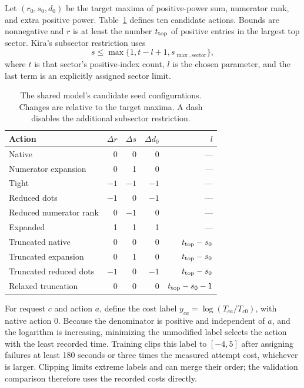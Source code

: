 Let $(r_0,s_0,d_0)$ be the target maxima of positive-power sum, numerator rank, and extra positive power. Table~\ref{project:tab:shared-actions} defines ten candidate actions. Bounds are nonnegative and $r$ is at least the number $t_{\rm top}$ of positive entries in the largest top sector. Kira's subsector restriction uses~\cite{Kira3}
\begin{equation}
 s\leq\max\{1,t-l+1,s_{\max,\mathrm{sector}}\},
 \label{project:eq:truncation-new}
\end{equation}
where $t$ is that sector's positive-index count, $l$ is the chosen parameter, and the last term is an explicitly assigned sector limit.
\begin{table}[!htbp]\centering\small
\caption{The shared model's candidate seed configurations. Changes are relative to the target maxima. A dash disables the additional subsector restriction.}
\label{project:tab:shared-actions}
\begin{tabular}{@{}lrrrr@{}}\toprule
Action & $\Delta r$ & $\Delta s$ & $\Delta d_0$ & $l$\\\midrule
Native &0&0&0&---\\
Numerator expansion &0&1&0&---\\
Tight & $-1$&$-1$&$-1$&---\\
Reduced dots &$-1$&0&$-1$&---\\
Reduced numerator rank &0&$-1$&0&---\\
Expanded &1&1&1&---\\
Truncated native &0&0&0&$t_{\rm top}-s_0$\\
Truncated expansion &0&1&0&$t_{\rm top}-s_0$\\
Truncated reduced dots &$-1$&0&$-1$&$t_{\rm top}-s_0$\\
Relaxed truncation &0&0&0&$t_{\rm top}-s_0-1$\\\bottomrule
\end{tabular}
\end{table}

For request $c$ and action $a$, define the cost label $y_{ca}=\log(T_{ca}/T_{c0})$, with native action $0$. Because the denominator is positive and independent of $a$, and the logarithm is increasing, minimizing the unmodified label selects the action with the least recorded time. Training clips this label to $[-4,5]$ after assigning failures at least 180 seconds or three times the measured attempt cost, whichever is larger. Clipping limits extreme labels and can merge their order; the validation comparison therefore uses the recorded costs directly.

